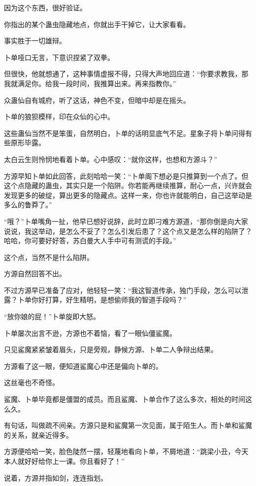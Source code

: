 \begin{this_body}
因为这个东西，很好验证。

你指出的某个蛊虫隐藏地点，你就出手干掉它，让大家看看。

事实胜于一切雄辩。

卜单哑口无言，下意识捏紧了双拳。

但很快，他就想通了，这种事情虚报不得，只得大声地回应道：“你要求教我，那我就满足你。给我一段时间，我推算出来。再来指教你。”

众蛊仙自有城府，听了这话，神色不变，但暗中却是在摇头。

卜单的狼狈模样，印在众仙的心中。

这些蛊仙当然不是笨蛋，自然明白，卜单的话明显底气不足。星象子将卜单问得有些原形毕露。

太白云生则怜悯地看着卜单。心中感叹：“就你这样，也想和方源斗？”

方源早知卜单如此回答，此刻哈哈一笑：“卜单阁下想必是只推算到一个点了。但这个点隐藏的蛊虫，其实只是一个陷阱。你若能再继续推算，耐心一点，兴许就会发现更多的破绽，算出更多的隐藏点。这样一来，你也许就能明白，自己这举动是多么的鲁莽了。”

“哦？”卜单嘴角一扯，他早已想好说辞，此时立即刁难方源道，“那你倒是向大家说说，我这举动，是怎么不妥了？怎么引发后患了？这个点又是怎么样的陷阱了？哈哈，你可要好好答，苏白曼大人手中可有测谎的手段。”

这个点，当然不是什么陷阱。

方源自然回答不出。

不过方源早已准备了应对，他轻轻一笑：“我这智道传承，独门手段，怎么可以泄露？卜单你好打算，好生精明，是想偷师我的智道手段吗？”

“放你娘的屁！”卜单旋即大怒。

卜单屡次出言不逊，方源也不着恼，看了一眼仙僵鲨魔。

只见鲨魔紧紧皱着眉头，只是旁观，静候方源、卜单二人争辩出结果。

方源看了这一眼，便知道鲨魔心中还是偏向卜单的。

这丝毫也不奇怪。

鲨魔、卜单毕竟都是僵盟的成员。而且鲨魔、卜单合作了这么多次，相处的时间这么久。

有句话，叫做疏不间亲。方源只是和鲨魔第一次见面，属于陌生人。而卜单和鲨魔的关系，就亲近得多。

方源便哈哈一笑，脸色陡然一摆，轻蔑地看向卜单，不屑地道：“跳梁小丑，今天本人就好好给你上一课。你且看好了！”

说着，方源并指如剑，连连指划。


\end{this_body}
